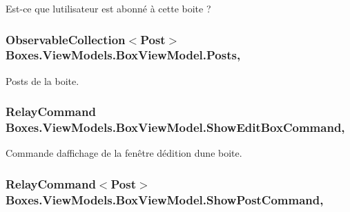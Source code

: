 Est-\/ce que l\textquotesingle{}utilisateur est abonné à cette boite ? 

\subsubsection[{\texorpdfstring{Posts}{Posts}}]{\setlength{\rightskip}{0pt plus 5cm}Observable\+Collection$<${\bf Post}$>$ Boxes.\+View\+Models.\+Box\+View\+Model.\+Posts\hspace{0.3cm}{\ttfamily [get]}, {\ttfamily [set]}}\hypertarget{class_boxes_1_1_view_models_1_1_box_view_model_a31e87a4628c6c9c8506a71457c042f4d}{}\label{class_boxes_1_1_view_models_1_1_box_view_model_a31e87a4628c6c9c8506a71457c042f4d}


Posts de la boite. 

\subsubsection[{\texorpdfstring{Show\+Edit\+Box\+Command}{ShowEditBoxCommand}}]{\setlength{\rightskip}{0pt plus 5cm}Relay\+Command Boxes.\+View\+Models.\+Box\+View\+Model.\+Show\+Edit\+Box\+Command\hspace{0.3cm}{\ttfamily [get]}, {}}\hypertarget{class_boxes_1_1_view_models_1_1_box_view_model_a794084993b6116de56455d6a2f255a61}{}\label{class_boxes_1_1_view_models_1_1_box_view_model_a794084993b6116de56455d6a2f255a61}


Commande d\textquotesingle{}affichage de la fenêtre d\textquotesingle{}édition d\textquotesingle{}une boite. 

\subsubsection[{\texorpdfstring{Show\+Post\+Command}{ShowPostCommand}}]{\setlength{\rightskip}{0pt plus 5cm}Relay\+Command$<${\bf Post}$>$ Boxes.\+View\+Models.\+Box\+View\+Model.\+Show\+Post\+Command\hspace{0.3cm}{\ttfamily [get]}, {}}\hypertarget{class_boxes_1_1_view_models_1_1_box_view_model_a710b5fcbc616b99d09452dbf30410d6a}{}\label{class_boxes_1_1_view_models_1_1_box_view_model_a710b5fcbc616b99d09452dbf30410d6a}



